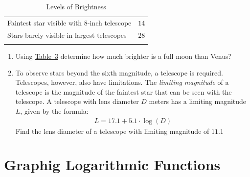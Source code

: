 \documentclass[10pt,]{book}
\theoremstyle{plain}
\theoremstyle{definition}
\theoremstyle{definition}
\theoremstyle{definition}
\numberwithin{equation}{section}
\newcommand{\hrulethick} {\noalign{\hrule height 0.11em}}
\begin{document}
\begin{exerciselist}
\begin{table}
\begin{tabular}{cc}
\multicolumn{1}{l}{Faintest star visible with \(8\)-inch telescope}&\(14\)\tabularnewline[0pt]
\multicolumn{1}{l}{Stars barely visible in largest telescopes}&\(28\)\tabularnewline\hrulethick
\end{tabular}
\caption{Levels of Brightness\label{star-chart}}
\end{table}
\hypertarget{p-322}{}%
\leavevmode%
\begin{enumerate}[label=(\alph*)]
\item\hypertarget{li-235}{}Using \hyperref[star-chart]{Table~3} determine how much brighter is a full moon than Venus?%
\item\hypertarget{li-236}{}To observe stars beyond the sixth magnitude, a telescope is required.  Telescopes, however, also have limitations.  The \emph{limiting magnitude} of a telescope is the magnitude of the faintest star that can be seen with the telescope.  A telescope with lens diameter \(D\) meters has a limiting magnitude \(L\), given by the formula:%
\begin{gather*}
L = 17.1 + 5.1 \cdot \log (D)
\end{gather*}
Find the lens diameter of a telescope with limiting magnitude of \(11.1\)%
\end{enumerate}
%
\par\smallskip
\end{exerciselist}
\typeout{************************************************}
\typeout{************************************************}
\section[{Graphig Logarithmic Functions}]{Graphig Logarithmic Functions}\label{chapter05-section03}
\typeout{************************************************}
\typeout{************************************************}
\end{document}
